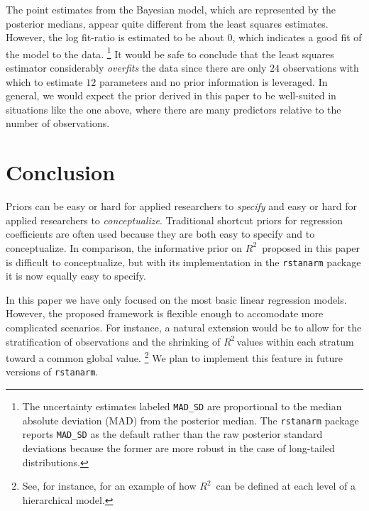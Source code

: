 \documentclass[11pt]{article}
\newcommand{\Rsq}{$R^2\,$}
\begin{document}
The point estimates from the Bayesian model, which are represented by the
posterior medians, appear quite different from the least squares estimates.
However, the log fit-ratio is estimated to be about $0$, which indicates a good
fit of the model to the data.%
\footnote{The uncertainty estimates labeled {\tt MAD\_SD} are proportional to
the median absolute deviation (MAD) from the posterior median. The
{\tt rstanarm} package reports {\tt MAD\_SD} as the default rather than the raw
posterior standard deviations because the former are more robust in the case of
long-tailed distributions.}
It would be safe to conclude that the least squares estimator considerably
\emph{overfits} the data since there are only $24$ observations with which to
estimate $12$ parameters and no prior information is leveraged. In general, we
would expect the prior derived in this paper to be well-suited in situations
like the one above, where there are many predictors relative to the number of
observations.


\section{Conclusion}

Priors can be easy or hard for applied researchers to \emph{specify} and easy or
hard for applied researchers to \emph{conceptualize}. Traditional shortcut
priors for regression coefficients are often used because they are both easy to
specify and to conceptualize. In comparison, the informative prior on \Rsq
proposed in this paper is difficult to conceptualize, but with its
implementation in the {\tt rstanarm} package it is now equally easy to specify.

In this paper we have only focused on the most basic linear regression models.
However, the proposed framework is flexible enough to accomodate more
complicated scenarios. For instance, a natural extension would be to allow for
the stratification of observations and the shrinking of \Rsq values within each
stratum toward a common global value.%
\footnote{See, for instance,  for an example of how \Rsq
can be defined at each level of a hierarchical model.}
We plan to implement this feature in future versions of {\tt rstanarm}.


\nocite{Rcore}
\nocite{HSAUR3-package}

\end{document}
